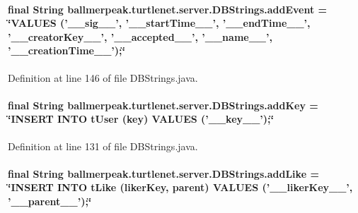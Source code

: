 \hypertarget{classballmerpeak_1_1turtlenet_1_1server_1_1DBStrings_a179f2c1d92f556d4fa74acf16cf13f7a}{
\paragraph[{add\-Event}]{\setlength{\rightskip}{0pt plus 5cm}final String ballmerpeak.\-turtlenet.\-server.\-D\-B\-Strings.\-add\-Event = \char`\"{}V\-A\-L\-U\-E\-S ('\-\_\-\-\_\-sig\-\_\-\-\_\-', '\-\_\-\-\_\-start\-Time\-\_\-\-\_\-', '\-\_\-\-\_\-end\-Time\-\_\-\-\_\-', '\-\_\-\-\_\-creator\-Key\-\_\-\-\_\-', '\-\_\-\-\_\-accepted\-\_\-\-\_\-', '\-\_\-\-\_\-name\-\_\-\-\_\-', '\-\_\-\-\_\-creation\-Time\-\_\-\-\_\-');\char`\"{}\hspace{0.3cm}{\ttfamily [static]}}}\label{classballmerpeak_1_1turtlenet_1_1server_1_1DBStrings_a179f2c1d92f556d4fa74acf16cf13f7a}


Definition at line 146 of file D\-B\-Strings.\-java.

\hypertarget{classballmerpeak_1_1turtlenet_1_1server_1_1DBStrings_a411c712ba8bd368765dfd890abca6106}{
\paragraph[{add\-Key}]{\setlength{\rightskip}{0pt plus 5cm}final String ballmerpeak.\-turtlenet.\-server.\-D\-B\-Strings.\-add\-Key = \char`\"{}I\-N\-S\-E\-R\-T I\-N\-T\-O t\-User (key) V\-A\-L\-U\-E\-S ('\-\_\-\-\_\-key\-\_\-\-\_\-');\char`\"{}\hspace{0.3cm}{\ttfamily [static]}}}\label{classballmerpeak_1_1turtlenet_1_1server_1_1DBStrings_a411c712ba8bd368765dfd890abca6106}


Definition at line 131 of file D\-B\-Strings.\-java.

\hypertarget{classballmerpeak_1_1turtlenet_1_1server_1_1DBStrings_a2a78b8bf2571d76c753619719f6f5aac}{
\paragraph[{add\-Like}]{\setlength{\rightskip}{0pt plus 5cm}final String ballmerpeak.\-turtlenet.\-server.\-D\-B\-Strings.\-add\-Like = \char`\"{}I\-N\-S\-E\-R\-T I\-N\-T\-O t\-Like (liker\-Key, parent) V\-A\-L\-U\-E\-S ('\-\_\-\-\_\-liker\-Key\-\_\-\-\_\-', '\-\_\-\-\_\-parent\-\_\-\-\_\-');\char`\"{}\hspace{0.3cm}{\ttfamily [static]}}}\label{classballmerpeak_1_1turtlenet_1_1server_1_1DBStrings_a2a78b8bf2571d76c753619719f6f5aac}


